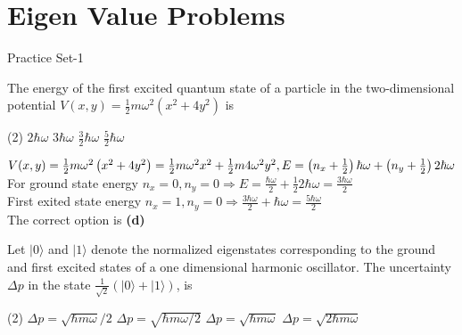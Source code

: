 \chapter{Eigen Value Problems}
\begin{abox}
	Practice Set-1 
	\end{abox}
\begin{enumerate}
	\begin{minipage}{\textwidth}
	\item The energy of the first excited quantum state of a particle in the two-dimensional potential $V(x, y)=\frac{1}{2} m \omega^{2}\left(x^{2}+4 y^{2}\right)$ is
\end{minipage}
\begin{tasks}(2)
	\task[\textbf{A.}] $2 \hbar \omega$
	\task[\textbf{B.}]$3 \hbar \omega$
	\task[\textbf{C.}]$\frac{3}{2} \hbar \omega$
	\task[\textbf{D.}] $\frac{5}{2} \hbar \omega$
\end{tasks}
\begin{answer}
	$V(x, y)=\frac{1}{2} m \omega^{2}\left(x^{2}+4 y^{2}\right)=\frac{1}{2} m \omega^{2} x^{2}+\frac{1}{2} m 4 \omega^{2} y^{2}, \\
	E=\left(n_{x}+\frac{1}{2}\right) \hbar \omega+\left(n_{y}+\frac{1}{2}\right) 2 \hbar \omega$\\
	For ground state energy $n_{x}=0, n_{y}=0 \Rightarrow E=\frac{\hbar \omega}{2}+\frac{1}{2} 2 \hbar \omega=\frac{3 \hbar \omega}{2}$\\
	First exited state energy $n_{x}=1, n_{y}=0 \Rightarrow \frac{3 \hbar \omega}{2}+\hbar \omega=\frac{5 \hbar \omega}{2}$\\
	The correct option is \textbf{(d)}
\end{answer}
\begin{minipage}{\textwidth}
	\item Let $|0\rangle$ and $|1\rangle$ denote the normalized eigenstates corresponding to the ground and first excited states of a one dimensional harmonic oscillator. The uncertainty $\Delta p$ in the state $\frac{1}{\sqrt{2}}(|0\rangle+|1\rangle)$, is
\end{minipage}
\begin{tasks}(2)
	\task[\textbf{A.}] $\Delta p=\sqrt{\hbar m \omega} / 2$
	\task[\textbf{B.}]$\Delta p=\sqrt{\hbar m \omega / 2}$
	\task[\textbf{C.}]$\Delta p=\sqrt{\hbar m \omega}$
	\task[\textbf{D.}]$\Delta p=\sqrt{2 \hbar m \omega}$
\end{tasks}
\begin{answer}

\end{answer}
\end{enumerate}
